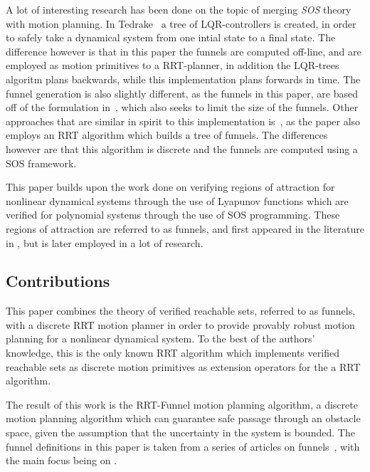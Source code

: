 A lot of interesting research has been done on the topic of merging \textit{SOS}
theory with motion planning. In Tedrake~\cite{tedrakeLQRtreesFeedbackMotion2009}
a tree of LQR-controllers is created, in order to safely take a dynamical system
from one intial state to a final state. The difference however is that in this
paper the funnels are computed off-line, and are employed as motion primitives
to a RRT-planner, in addition the LQR-trees algoritm plans backwards, while this
implementation plans forwards in time. The funnel generation is also slightly
different, as the funnels in this paper, are based off of the formulation
in~\cite{majumdarFunnelLibrariesRealtime2017}, which also seeks to limit the
size of the funnels. Other approaches that are similar in spirit to this
implementation is~\cite{lenySequentialCompositionRobust2012}, as the paper also
employs an RRT algorithm which builds a tree of funnels. The differences however
are that this algorithm is discrete and the funnels are computed using a SOS
framework.


This paper builds upon the work done on verifying regions of attraction for
nonlinear dynamical systems through the use of Lyapunov functions which are
verified for polynomial systems through the use of SOS programming. These
regions of attraction are referred to as funnels, and first appeared in the
literature in \cite{masonMechanicsManipulation1985}, but is later employed in a
lot of research.


\subsection{Contributions}

This paper combines the theory of verified reachable sets, referred to as
funnels, with a discrete RRT motion planner in order to provide provably robust
motion planning for a nonlinear dynamical system. To the best of the authors'
knowledge, this is the only known RRT algorithm which implements verified
reachable sets as discrete motion primitives as extension operators for the a
RRT algorithm.

The result of this work is the RRT-Funnel motion planning algorithm, a discrete
motion planning algorithm which can guarantee safe passage through an obstacle
space, given the assumption that the uncertainty in the system is bounded. The
funnel definitions in this paper is taken from a series of articles on
funnels~\cite{Tobenkin_2011,tedrakeLQRtreesFeedbackMotion2009,
  majumdarRobustOnlineMotion2013,
  majumdarFunnelLibrariesRealtime2017,ahmadi2014dsos}, with the main focus being
on \cite{majumdarFunnelLibrariesRealtime2017}.



